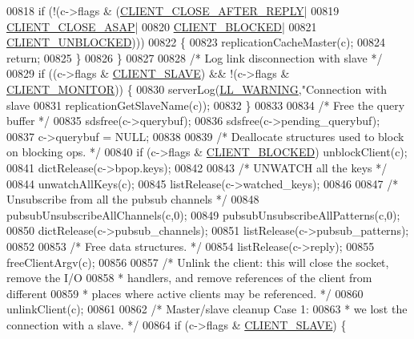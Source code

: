 \begin{DoxyCode}
{{{{{{{{{00818         \textcolor{keywordflow}{if} (!(c->flags & (\hyperlink{server_8h_a8cff2154afcc2e87ac85bdbbe2814091}{CLIENT\_CLOSE\_AFTER\_REPLY}|
00819                           \hyperlink{server_8h_ad6690c6231b67525b8b2057e092a8361}{CLIENT\_CLOSE\_ASAP}|
00820                           \hyperlink{server_8h_a503ad979164a52f0f5e2a63e4c7da3a0}{CLIENT\_BLOCKED}|
00821                           \hyperlink{server_8h_a1252372d6834686c29e958d9d96367a8}{CLIENT\_UNBLOCKED})))
00822         \{
00823             replicationCacheMaster(c);
00824             \textcolor{keywordflow}{return};
00825         \}
00826     \}
00827 
00828     \textcolor{comment}{/* Log link disconnection with slave */}
00829     \textcolor{keywordflow}{if} ((c->flags & \hyperlink{server_8h_ae9f6995948253652bc9454d79a72f4a7}{CLIENT\_SLAVE}) && !(c->flags & 
      \hyperlink{server_8h_a7724350e4f0ddbf1c80740699fac78be}{CLIENT\_MONITOR})) \{
00830         serverLog(\hyperlink{server_8h_a31229b9334bba7d6be2a72970967a14b}{LL\_WARNING},\textcolor{stringliteral}{"Connection with slave %
00831             replicationGetSlaveName(c));
00832     \}
00833 
00834     \textcolor{comment}{/* Free the query buffer */}
00835     sdsfree(c->querybuf);
00836     sdsfree(c->pending\_querybuf);
00837     c->querybuf = NULL;
00838 
00839     \textcolor{comment}{/* Deallocate structures used to block on blocking ops. */}
00840     \textcolor{keywordflow}{if} (c->flags & \hyperlink{server_8h_a503ad979164a52f0f5e2a63e4c7da3a0}{CLIENT\_BLOCKED}) unblockClient(c);
00841     dictRelease(c->bpop.keys);
00842 
00843     \textcolor{comment}{/* UNWATCH all the keys */}
00844     unwatchAllKeys(c);
00845     listRelease(c->watched\_keys);
00846 
00847     \textcolor{comment}{/* Unsubscribe from all the pubsub channels */}
00848     pubsubUnsubscribeAllChannels(c,0);
00849     pubsubUnsubscribeAllPatterns(c,0);
00850     dictRelease(c->pubsub\_channels);
00851     listRelease(c->pubsub\_patterns);
00852 
00853     \textcolor{comment}{/* Free data structures. */}
00854     listRelease(c->reply);
00855     freeClientArgv(c);
00856 
00857     \textcolor{comment}{/* Unlink the client: this will close the socket, remove the I/O}
00858 \textcolor{comment}{     * handlers, and remove references of the client from different}
00859 \textcolor{comment}{     * places where active clients may be referenced. */}
00860     unlinkClient(c);
00861 
00862     \textcolor{comment}{/* Master/slave cleanup Case 1:}
00863 \textcolor{comment}{     * we lost the connection with a slave. */}
00864     \textcolor{keywordflow}{if} (c->flags & \hyperlink{server_8h_ae9f6995948253652bc9454d79a72f4a7}{CLIENT\_SLAVE}) \{
}}}}}}}}}}
\end{DoxyCode}
